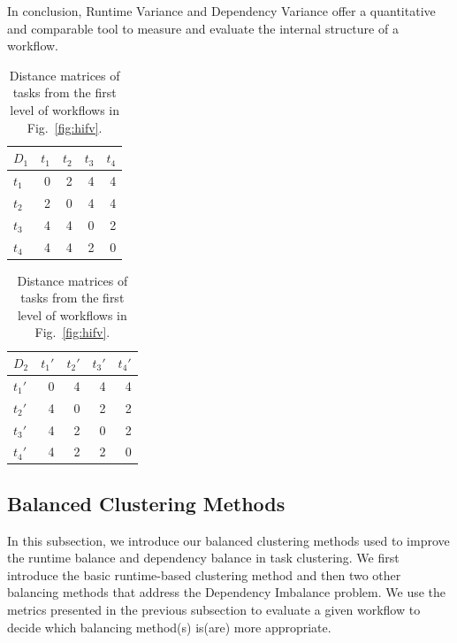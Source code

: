 \documentclass[final]{IEEEtran}
\begin{document}
In conclusion, Runtime Variance and Dependency Variance offer a quantitative and comparable tool to measure and evaluate the internal structure of a workflow. 



\begin{table}[htb]
	\footnotesize
	\centering
	\begin{tabular}{l|rrrr}
		$D_1$ & $t_1$ & $t_2$ & $t_3$ &$t_4$\\
		\hline
		$t_1$ & 0 & 2 & 4 & 4 \\
		$t_2$ & 2 & 0 & 4 & 4 \\
		$t_3$ & 4 & 4 & 0 & 2\\
		$t_4$ & 4 & 4 & 2 & 0 \\
	\end{tabular}
	\quad
	\begin{tabular}{l|rrrr}
		$D_2$ & $t_1'$ & $t_2'$ & $t_3'$ &$t_4'$\\
		\hline
		$t_1'$ & 0 & 4 & 4 & 4 \\
		$t_2'$ & 4 & 0 & 2 & 2 \\
		$t_3'$ & 4 & 2 & 0 & 2\\
		$t_4'$ & 4 & 2 & 2 & 0 \\
	\end{tabular}
	\caption{Distance matrices of tasks from the first level of workflows in Fig.~\ref{fig:hifv}.}
	\label{tab:1}
	\vspace{-20pt}
\end{table}


\subsection{Balanced Clustering Methods}
\label{sec:methods}
In this subsection, we introduce our balanced clustering methods used to improve the runtime balance and dependency balance in task clustering. We first introduce the basic runtime-based clustering method and then two other balancing methods that address the Dependency Imbalance problem. We use the metrics presented in the previous subsection to evaluate a given workflow to decide which balancing method(s) is(are) more appropriate. 
\end{document}
